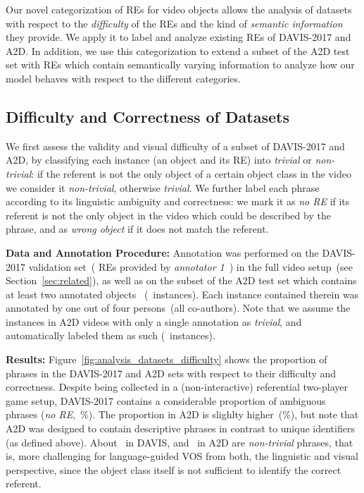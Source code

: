 \documentclass[10pt,twocolumn,letterpaper]{article}
\begin{document}
Our novel categorization of REs for video objects allows the analysis of datasets with respect to the \textit{difficulty} of the REs and the kind of \textit{semantic information} they provide. We apply it to label and analyze existing REs of DAVIS-2017 and A2D. In addition, we use this categorization to extend a subset of the A2D test set with REs which contain semantically varying information to analyze how our model behaves with respect to the different categories.




\subsection{Difficulty and Correctness of Datasets}
We first assess the validity and visual difficulty of a subset of DAVIS-2017 and A2D, by classifying each instance (an object and its RE) into \textit{trivial} or \textit{non-trivial}: if the referent is not the only object of a certain object class in the video 
we consider it \textit{non-trivial}, otherwise \textit{trivial}. 
We further label each phrase according to its linguistic ambiguity and correctness: we mark it as \textit{no RE} if its referent is not the only object in the video which could be described by the phrase, and as \textit{wrong object} if it does not match the referent. 

\noindent
\textbf{Data and Annotation Procedure:}
Annotation was performed on the DAVIS-2017 validation set~( REs provided by \textit{annotator 1}~\cite{khoreva2018video}) in the full video setup~(see Section~\ref{sec:related}), as well as on the subset of the A2D test set which contains at least two annotated objects 
~(~instances). 
Each instance contained therein was annotated by one out of four persons~(all co-authors). 
Note that we assume the instances in A2D videos with only a single annotation as \textit{trivial}, and automatically labeled them as such (~instances). 






\noindent
\textbf{Results:}
Figure~\ref{fig:analysis_datasets_difficulty} shows the proportion of phrases in the DAVIS-2017 and A2D sets with respect to their difficulty and correctness. 
Despite being collected in a (non-interactive) referential two-player game setup, DAVIS-2017 contains a considerable proportion of ambiguous phrases (\textsl{no RE},~\%).  
The proportion in A2D is slighlty higher~(\%), but note that A2D was designed to contain descriptive phrases in contrast to unique identifiers (as defined above). 
About~ in DAVIS, and ~in A2D are \textit{non-trivial} phrases, that is, more challenging for language-guided VOS from both, the linguistic and visual perspective, since the object class itself is not sufficient to identify the correct referent. 
\end{document}
